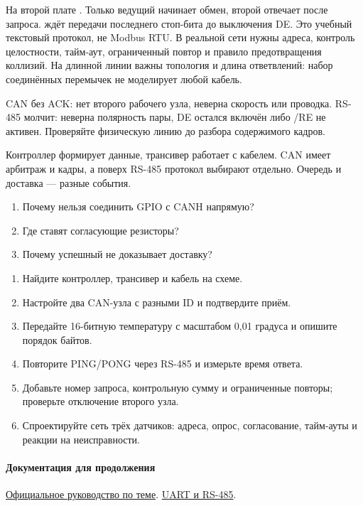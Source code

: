 
На второй плате . Только ведущий начинает обмен, второй отвечает после запроса.
 ждёт передачи последнего стоп-бита до выключения DE.
Это учебный текстовый протокол, не Modbus RTU. В реальной сети нужны адреса, контроль целостности,
тайм-аут, ограниченный повтор и правило предотвращения коллизий. На длинной линии важны
топология и длина ответвлений: набор соединённых перемычек не моделирует любой кабель.

\begin{trouble}
CAN без ACK: нет второго рабочего узла, неверна скорость или проводка.
RS-485 молчит: неверна полярность пары, DE остался включён либо /RE не активен.
Проверяйте физическую линию до разбора содержимого кадров.
\end{trouble}
\begin{summary}
Контроллер формирует данные, трансивер работает с кабелем. CAN имеет арбитраж и кадры,
а поверх RS-485 протокол выбирают отдельно. Очередь и доставка --- разные события.
\end{summary}

\begin{selfcheck}
\begin{enumerate}
\item Почему нельзя соединить GPIO с CANH напрямую?
\item Где ставят согласующие резисторы?
\item Почему успешный  не доказывает доставку?
\end{enumerate}
\end{selfcheck}
\begin{tasks}
\begin{enumerate}
\item {} Найдите контроллер, трансивер и кабель на схеме.
\item {} Настройте два CAN-узла с разными ID и подтвердите приём.
\item {} Передайте 16-битную температуру с масштабом 0,01 градуса и опишите порядок байтов.
\item {} Повторите PING/PONG через RS-485 и измерьте время ответа.
\item {} Добавьте номер запроса, контрольную сумму и ограниченные повторы; проверьте отключение второго узла.
\item {} Спроектируйте сеть трёх датчиков: адреса, опрос, согласование, тайм-ауты и реакции на неисправности.
\end{enumerate}
\end{tasks}

\paragraph{Документация для продолжения}\href{https://docs.espressif.com/projects/esp-idf/en/v5.4/esp32s3/api-reference/peripherals/twai.html}{Официальное руководство по теме}.
\href{https://docs.espressif.com/projects/esp-idf/en/v5.4/esp32s3/api-reference/peripherals/uart.html}{UART и RS-485}.
